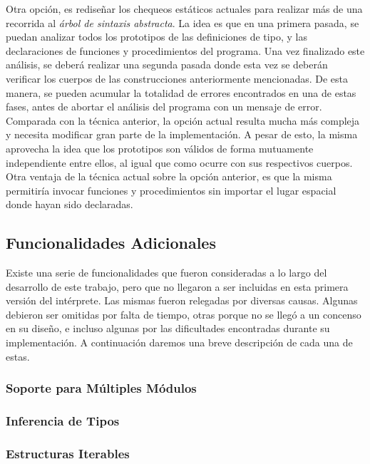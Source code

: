 Otra opción, es rediseñar los chequeos estáticos actuales para realizar más de una recorrida al \textit{árbol de sintaxis abstracta}.
La idea es que en una primera pasada, se puedan analizar todos los prototipos de las definiciones de tipo, y las declaraciones de funciones y procedimientos del programa.
Una vez finalizado este análisis, se deberá realizar una segunda pasada donde esta vez se deberán verificar los cuerpos de las construcciones anteriormente mencionadas.
De esta manera, se pueden acumular la totalidad de errores encontrados en una de estas fases, antes de abortar el análisis del programa con un mensaje de error.
Comparada con la técnica anterior, la opción actual resulta mucha más compleja y necesita modificar gran parte de la implementación.
A pesar de esto, la misma aprovecha la idea que los prototipos son válidos de forma mutuamente independiente entre ellos, al igual que como ocurre con sus respectivos cuerpos.
Otra ventaja de la técnica actual sobre la opción anterior, es que la misma permitiría invocar funciones y procedimientos sin importar el lugar espacial donde hayan sido declaradas.

\subsection{Funcionalidades Adicionales}

Existe una serie de funcionalidades que fueron consideradas a lo largo del desarrollo de este trabajo, pero que no llegaron a ser incluidas en esta primera versión del intérprete.
Las mismas fueron relegadas por diversas causas.
Algunas debieron ser omitidas por falta de tiempo, otras porque no se llegó a un concenso en su diseño, e incluso algunas por las dificultades encontradas durante su implementación.
A continuación daremos una breve descripción de cada una de estas.

\subsubsection{Soporte para Múltiples Módulos}

\subsubsection{Inferencia de Tipos}

\subsubsection{Estructuras Iterables}

